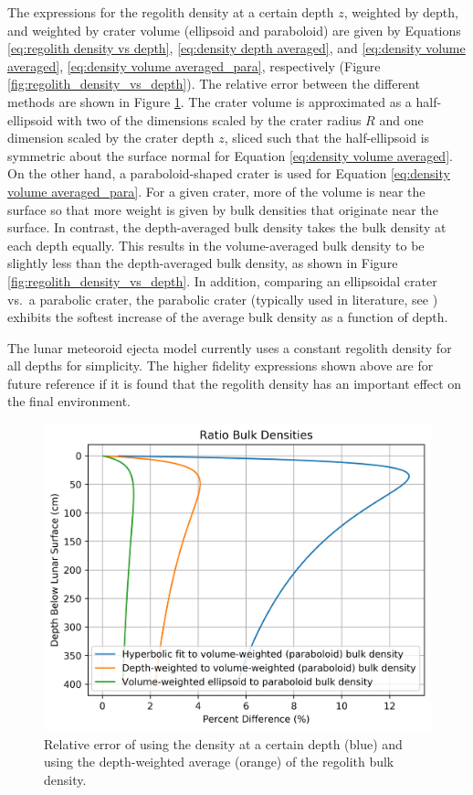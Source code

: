 \documentclass{article}
\begin{document}
The expressions for the regolith density at a certain depth $z$, weighted by depth, and weighted by crater volume (ellipsoid and paraboloid) are given by Equations \eqref{eq:regolith density vs depth}, \eqref{eq:density depth averaged}, and \eqref{eq:density volume averaged}, \eqref{eq:density volume averaged_para}, respectively (Figure \ref{fig:regolith_density_vs_depth}). The relative error between the different methods are shown in Figure \ref{fig:ratio_of_avg_bulk_density}. The crater volume is approximated as a half-ellipsoid with two of the dimensions scaled by the crater radius $R$ and one dimension scaled by the crater depth $z$, sliced such that the half-ellipsoid is symmetric about the surface normal for Equation \eqref{eq:density volume averaged}. On the other hand, a paraboloid-shaped crater is used for Equation \eqref{eq:density volume averaged_para}. For a given crater, more of the volume is near the surface so that more weight is given by bulk densities that originate near the surface. In contrast, the depth-averaged bulk density takes the bulk density at each depth equally. This results in the volume-averaged bulk density to be slightly less than the depth-averaged bulk density, as shown in Figure \ref{fig:regolith_density_vs_depth}. In addition, comparing an ellipsoidal crater vs.\ a parabolic crater, the parabolic crater (typically used in literature, see \cite{singer2020lunar}) exhibits the softest increase of the average bulk density as a function of depth.

The lunar meteoroid ejecta model currently uses a constant regolith density for all depths for simplicity. The higher fidelity expressions shown above are for future reference if it is found that the regolith density has an important effect on the final environment.


\begin{figure}[!htb]
	\centering
	\includegraphics[width=\linewidth]{ratio_of_avg_bulk_density.png}
	\caption{Relative error of using the density at a certain depth (blue) and using the depth-weighted average (orange) of the regolith bulk density.}
	\label{fig:ratio_of_avg_bulk_density}
\end{figure}
\end{document}
